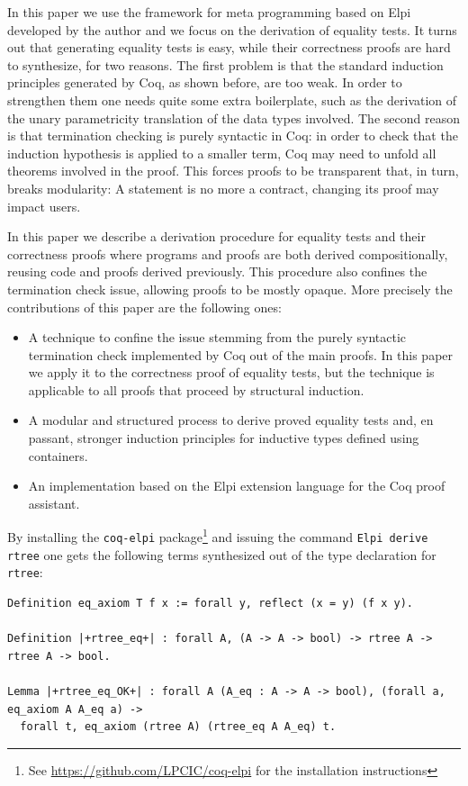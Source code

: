 \documentclass[a4paper,UKenglish,cleveref, autoref]{lipics-v2019}
\begin{document}
In this paper we use the framework for meta programming based on
Elpi~\cite{dunchev:hal-01176856,tassi:hal-01637063} developed by the
author and we focus on the derivation of equality tests.
It turns out that generating equality tests is easy,
while their correctness proofs are hard to synthesize, for two reasons. 
The first problem is that 
the standard induction principles generated by Coq, as shown
before, are too weak. In order to strengthen them one needs quite some extra
boilerplate, such as the derivation of the unary parametricity
translation of the data types involved.
The second reason is that termination checking
is purely syntactic in Coq: %
in order to check that the induction
hypothesis is applied to a smaller term, Coq may need to unfold all
theorems involved in the proof. This forces proofs to
be transparent that, in turn, breaks modularity: A statement is no more a
contract, changing its proof may impact users.

In this paper we describe a derivation procedure for equality tests
and their correctness proofs
where programs and proofs are both
derived compositionally, reusing code and proofs derived previously.
This procedure also confines the termination check issue,
allowing proofs to be mostly opaque.
More precisely the contributions of this paper are the following ones:
\begin{itemize}
\item A technique to confine the issue stemming from the purely syntactic
	termination check implemented by Coq out of the
	main proofs. In this paper we apply it to the correctness
	proof of equality
	tests, but the technique is applicable to all proofs 
	that proceed by structural
	induction.

\item A modular and structured process to derive proved equality tests
		and, en passant, stronger
	induction principles for inductive types defined using
	containers.

\item An implementation based on the Elpi extension language
	for the Coq proof assistant.
\end{itemize}

\noindent
By installing the \lstinline+coq-elpi+
package\footnote{See \url{https://github.com/LPCIC/coq-elpi} for the
installation instructions} 
and issuing the command \lstinline+Elpi derive rtree+
one gets the following terms synthesized
out of the type declaration for \lstinline+rtree+:
\begin{lstlisting}
Definition eq_axiom T f x := forall y, reflect (x = y) (f x y).

Definition |+rtree_eq+| : forall A, (A -> A -> bool) -> rtree A -> rtree A -> bool.

Lemma |+rtree_eq_OK+| : forall A (A_eq : A -> A -> bool), (forall a, eq_axiom A A_eq a) ->
  forall t, eq_axiom (rtree A) (rtree_eq A A_eq) t.
\end{lstlisting}
\end{document}
